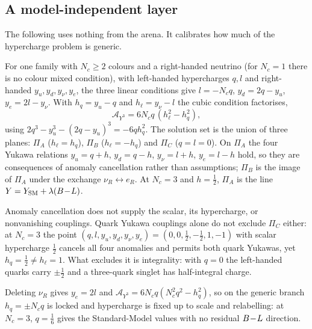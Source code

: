 \subsection{A model-independent layer}
\label{sec:modelindep}

The following uses nothing from the arena. It calibrates how much of the hypercharge problem is generic.

\begin{theorem}
\label{thm:variety}
For one family with $N_c\ge2$ colours and a right-handed neutrino (for $N_c=1$ there is no colour mixed condition), with left-handed
hypercharges $q,l$ and right-handed $y_u,y_d,y_\nu,y_e$,
the three linear conditions give $l=-N_cq$, $y_d=2q-y_u$, $y_e=2l-y_\nu$. With $h_q=y_u-q$ and $h_\ell=y_\nu-l$ the cubic condition
factorises,
\[
\mathcal A_{Y^3}=6N_cq\,(h_\ell^2-h_q^2),
\]
using $2q^3-y_u^3-(2q-y_u)^3=-6qh_q^2$. The solution set is the union of three planes: $\Pi_A$ ($h_\ell=h_q$), $\Pi_B$ ($h_\ell=-h_q$) and
$\Pi_C$ ($q=l=0$). On $\Pi_A$ the four Yukawa relations $y_u=q+h$, $y_d=q-h$, $y_\nu=l+h$, $y_e=l-h$ hold, so they are consequences of anomaly
cancellation rather than assumptions; $\Pi_B$ is the image of $\Pi_A$ under the exchange $\nu_R\leftrightarrow e_R$. At $N_c=3$ and
$h=\tfrac12$, $\Pi_A$ is the line $Y=Y_{\rm SM}+\lambda(B\!-\!L)$.
\end{theorem}

Anomaly cancellation does not supply the scalar, its hypercharge, or nonvanishing couplings. Quark Yukawa couplings alone do not exclude
$\Pi_C$ either: at $N_c=3$ the point $(q,l,y_u,y_d,y_\nu,y_e)=(0,0,\tfrac12,-\tfrac12,1,-1)$ with scalar hypercharge $\tfrac12$ cancels all four
anomalies and permits both quark Yukawas, yet $h_q=\tfrac12\neq h_\ell=1$. What excludes it is integrality: with $q=0$ the left-handed quarks
carry $\pm\tfrac12$ and a three-quark singlet has half-integral charge.

\begin{theorem}
\label{thm:nonu}
Deleting $\nu_R$ gives $y_e=2l$ and $\mathcal A_{Y^3}=6N_cq(N_c^2q^2-h_q^2)$, so on the generic branch $h_q=\pm N_cq$ is locked and
hypercharge is fixed up to scale and relabelling: at $N_c=3$, $q=\tfrac16$ gives the Standard-Model values with no residual $B\!-\!L$ direction.
\end{theorem}

